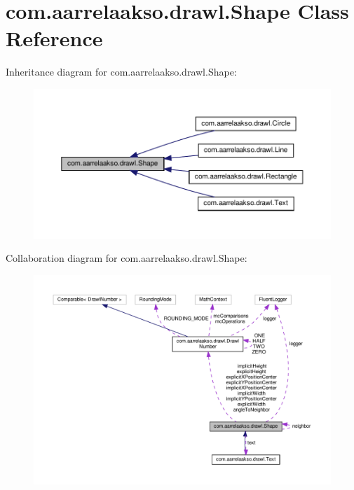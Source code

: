 \hypertarget{classcom_1_1aarrelaakso_1_1drawl_1_1_shape}{}\section{com.\+aarrelaakso.\+drawl.\+Shape Class Reference}
\label{classcom_1_1aarrelaakso_1_1drawl_1_1_shape}


Inheritance diagram for com.\+aarrelaakso.\+drawl.\+Shape\+:
\nopagebreak
\begin{figure}[H]
\begin{center}
\leavevmode
\includegraphics[width=350pt]{d1/d7f/classcom_1_1aarrelaakso_1_1drawl_1_1_shape__inherit__graph}
\end{center}
\end{figure}


Collaboration diagram for com.\+aarrelaakso.\+drawl.\+Shape\+:
\nopagebreak
\begin{figure}[H]
\begin{center}
\leavevmode
\includegraphics[width=350pt]{d7/d06/classcom_1_1aarrelaakso_1_1drawl_1_1_shape__coll__graph}
\end{center}
\end{figure}
